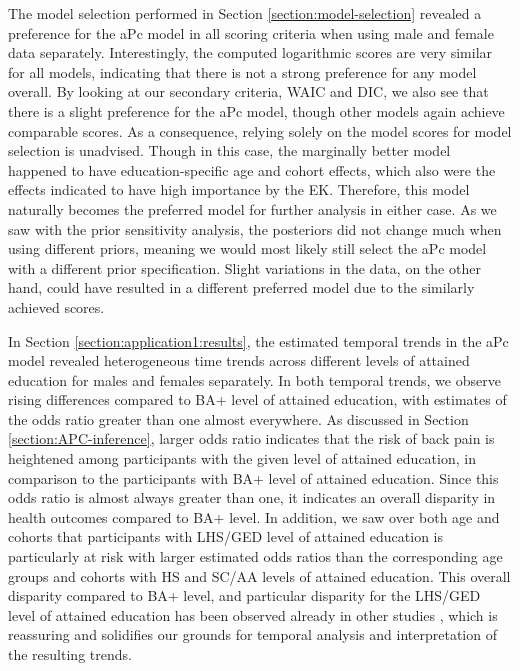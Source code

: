 \vspace{-0.2cm}
The model selection performed in Section \ref{section:model-selection} revealed a preference for the aPc model in all scoring criteria when using male and female data separately. Interestingly, the computed logarithmic scores are very similar for all models, indicating that there is not a strong preference for any model overall. By looking at our secondary criteria, WAIC and DIC, we also see that there is a slight preference for the aPc model, though other models again achieve comparable scores. As a consequence, relying solely on the model scores for model selection is unadvised. Though in this case, the marginally better model happened to have education-specific age and cohort effects, which also were the effects indicated to have high importance by the EK. Therefore, this model naturally becomes the preferred model for further analysis in either case. As we saw with the prior sensitivity analysis, the posteriors did not change much when using different priors, meaning we would most likely still select the aPc model with a different prior specification. Slight variations in the data, on the other hand, could have resulted in a different preferred model due to the similarly achieved scores. 

\vspace{-0.2cm}
In Section \ref{section:application1:results}, the estimated temporal trends in the aPc model revealed heterogeneous time trends across different levels of attained education for males and females separately. In both temporal trends, we observe rising differences compared to BA+ level of attained education, with estimates of the odds ratio greater than one almost everywhere. As discussed in Section \ref{section:APC-inference}, larger odds ratio indicates that the risk of back pain is heightened among participants with the given level of attained education, in comparison to the participants with BA+ level of attained education. Since this odds ratio is almost always greater than one, it indicates an overall disparity in health outcomes compared to BA+ level. In addition, we saw over both age and cohorts that participants with LHS/GED level of attained education is particularly at risk with larger estimated odds ratios than the corresponding age groups and cohorts with HS and SC/AA levels of attained education. This overall disparity compared to BA+ level, and particular disparity for the LHS/GED level of attained education has been observed already in other studies \citep{GEDdisparity}, which is reassuring and solidifies our grounds for temporal analysis and interpretation of the resulting trends.

